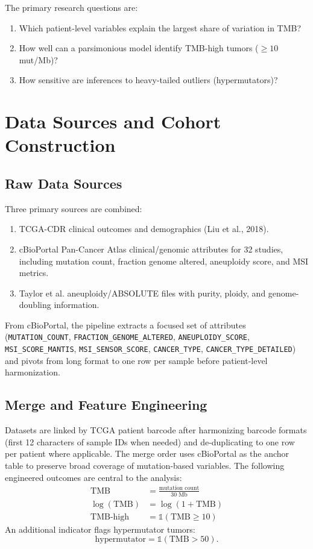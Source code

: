 \documentclass[11pt]{article}
\begin{document}
The primary research questions are:
\begin{enumerate}
    \item Which patient-level variables explain the largest share of variation in TMB?
    \item How well can a parsimonious model identify TMB-high tumors ($\geq 10$ mut/Mb)?
    \item How sensitive are inferences to heavy-tailed outliers (hypermutators)?
\end{enumerate}

\section{Data Sources and Cohort Construction}

\subsection{Raw Data Sources}
Three primary sources are combined:
\begin{enumerate}
    \item TCGA-CDR clinical outcomes and demographics (Liu et al., 2018).
    \item cBioPortal Pan-Cancer Atlas clinical/genomic attributes for 32 studies, including mutation count, fraction genome altered, aneuploidy score, and MSI metrics.
    \item Taylor et al. aneuploidy/ABSOLUTE files with purity, ploidy, and genome-doubling information.
\end{enumerate}

From cBioPortal, the pipeline extracts a focused set of attributes (\texttt{MUTATION\_COUNT}, \texttt{FRACTION\_GENOME\_ALTERED}, \texttt{ANEUPLOIDY\_SCORE}, \texttt{MSI\_SCORE\_MANTIS}, \texttt{MSI\_SENSOR\_SCORE}, \texttt{CANCER\_TYPE}, \texttt{CANCER\_TYPE\_DETAILED}) and pivots from long format to one row per sample before patient-level harmonization.

\subsection{Merge and Feature Engineering}
Datasets are linked by TCGA patient barcode after harmonizing barcode formats (first 12 characters of sample IDs when needed) and de-duplicating to one row per patient where applicable. The merge order uses cBioPortal as the anchor table to preserve broad coverage of mutation-based variables. The following engineered outcomes are central to the analysis:
\begin{align*}
\text{TMB} &= \frac{\text{mutation count}}{30 \text{ Mb}} \\
\log(\text{TMB}) &= \log(1 + \text{TMB}) \\
\text{TMB-high} &= \mathbb{1}(\text{TMB} \ge 10)
\end{align*}
An additional indicator flags hypermutator tumors:
\[
\text{hypermutator} = \mathbb{1}(\text{TMB} > 50).
\]
\end{document}
